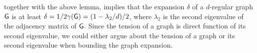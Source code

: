 \bigskip {} together with the above lemma,
implies that the expansion $\delta$ of a $d$-regular graph $\mathsf{G}$ is
at least $\delta = 1/2\DialX{\Graph} = \pth{1-\lambda_2/d}/2$, where
$\lambda_2$ is the second eigenvalue of the adjacency matrix of
$\mathsf{G}$. Since the tension of a graph is direct function of its
second eigenvalue, we could either argue about the tension of a graph
or its second eigenvalue when bounding the graph expansion.







% 
%

\ChapterEnd{}

 
